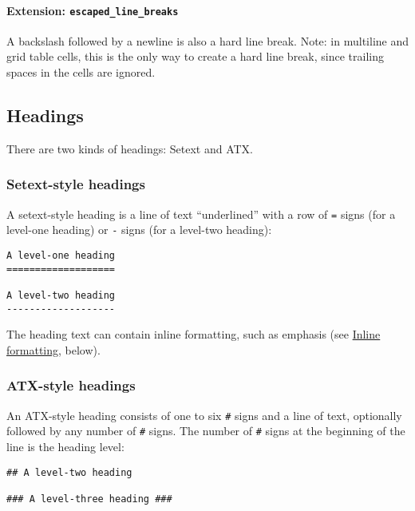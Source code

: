 \hypertarget{extension-escaped_line_breaks}{%
\paragraph{\texorpdfstring{Extension:
\texttt{escaped\_line\_breaks}}{Extension: escaped\_line\_breaks}}\label{extension-escaped_line_breaks}}

A backslash followed by a newline is also a hard line break. Note: in
multiline and grid table cells, this is the only way to create a hard
line break, since trailing spaces in the cells are ignored.

\hypertarget{headings}{%
\subsection{Headings}\label{headings}}

There are two kinds of headings: Setext and ATX.

\hypertarget{setext-style-headings}{%
\subsubsection{Setext-style headings}\label{setext-style-headings}}

A setext-style heading is a line of text ``underlined'' with a row of
\texttt{=} signs (for a level-one heading) or \texttt{-} signs (for a
level-two heading):

\begin{verbatim}
A level-one heading
===================

A level-two heading
-------------------
\end{verbatim}

The heading text can contain inline formatting, such as emphasis (see
\protect\hyperlink{inline-formatting}{Inline formatting}, below).

\hypertarget{atx-style-headings}{%
\subsubsection{ATX-style headings}\label{atx-style-headings}}

An ATX-style heading consists of one to six \texttt{\#} signs and a line
of text, optionally followed by any number of \texttt{\#} signs. The
number of \texttt{\#} signs at the beginning of the line is the heading
level:

\begin{verbatim}
## A level-two heading

### A level-three heading ###
\end{verbatim}

